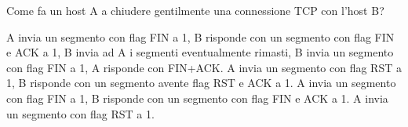 \question
Come fa un host A a chiudere gentilmente una connessione TCP con l'host B?

\begin{checkboxes}
	\CorrectChoice A invia un segmento con flag FIN a 1, B risponde con un segmento con flag FIN e ACK a 1, B invia ad A i segmenti eventualmente rimasti, B invia un segmento con flag FIN a 1, A risponde con FIN+ACK.
	\choice A invia un segmento con flag RST a 1, B risponde con un segmento avente flag RST e ACK a 1.
	\choice A invia un segmento con flag FIN a 1, B risponde con un segmento con flag FIN e ACK a 1.
	\choice A invia un segmento con flag RST a 1.
\end{checkboxes}

